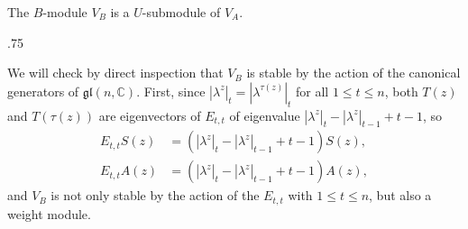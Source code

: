 \documentclass[11pt,fleqn]{article}
\makeatletter
\renewenvironment{proof}[1][\textit{Proof}]{\par
  \pushQED{\qed}%
  \normalfont \topsep.75\paraskip\relax
  \trivlist
  \item[\hskip\labelsep
        \itshape
    #1\@addpunct{.}]\ignorespaces
}{%
  \popQED\endtrivlist\@endpefalse
}
\newcommand\CC{\mathbb C}
\newcommand\gl{\mathfrak{gl}}
\makeatother
\begin{document}
\begin{Theorem}
\label{T:V-B-U-stable}
The $B$-module $V_B$ is a $U$-submodule of $V_A$.
\end{Theorem}
\begin{proof}
We will check by direct inspection that $V_B$ is stable by the action of the
canonical generators of $\gl(n,\CC)$. First, since $|\lambda^z|_t = 
|\lambda^{\tau(z)}|_t$ for all $1 \leq t \leq n$, both $T(z)$ and $T(\tau(z))$
are eigenvectors of $E_{t,t}$ of eigenvalue $|\lambda^z|_t - |\lambda^z|_{t-1} 
+ t-1$, so
\begin{align*}
E_{t,t} S(z) 
	&= (|\lambda^z|_t - |\lambda^z|_{t-1} + t-1) S(z), \\
E_{t,t} A(z) 
	&= (|\lambda^z|_t - |\lambda^z|_{t-1} + t-1) A(z),
\end{align*}
and $V_B$ is not only stable by the action of the $E_{t,t}$ with $1 \leq t 
\leq n$, but also a weight module.


\end{proof}
\end{document}
